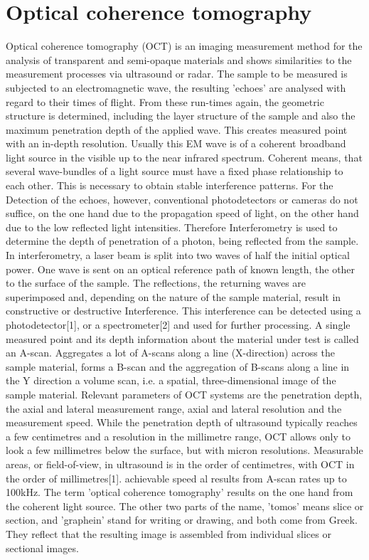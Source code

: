 \section{Optical coherence tomography}
Optical coherence tomography (OCT) is an imaging measurement method for the analysis of transparent and semi-opaque materials and shows similarities to the measurement processes via ultrasound or radar. The sample to be measured is subjected to an electromagnetic wave, the resulting 'echoes' are analysed with regard to their times of flight. From these run-times again,  the geometric structure is determined, including the layer structure of the sample and also the maximum penetration depth of the applied wave. This creates measured point with an in-depth resolution. Usually this EM wave is of a coherent broadband light source in the visible  up to the near infrared spectrum. Coherent means, that several wave-bundles of a light source must have a fixed phase relationship to each other. This is necessary to obtain stable interference patterns.  For the Detection of the echoes, however, conventional photodetectors or cameras do not suffice, on the one hand due to the propagation speed of light, on the other hand due to the low reflected light intensities. Therefore Interferometry is used to determine the depth of penetration of a photon, being reflected from the sample. In interferometry, a laser beam is split into two waves of half the initial optical power. One wave is sent on an optical reference path of known length, the other to the surface of the sample. The reflections, the returning waves are superimposed and, depending on the nature of the sample material, result in constructive or destructive Interference. This interference can be detected using a photodetector[1], or a spectrometer[2] and used for further processing. A single measured point and its depth information about the material under test is called an A-scan. Aggregates a lot of A-scans along a line (X-direction) across the sample material, forms a B-scan and the aggregation of B-scans along a line in the Y direction a volume scan, i.e. a spatial, three-dimensional image of the sample material. Relevant parameters of OCT systems are the penetration depth, the axial and lateral measurement range, axial and lateral resolution and the measurement speed. While the penetration depth of ultrasound typically reaches a few centimetres and a resolution in the millimetre range, OCT allows only to look a few millimetres below the surface, but with micron resolutions. Measurable areas, or field-of-view, in ultrasound is in the order of centimetres, with OCT in the order of millimetres[1]. achievable speed al results from A-scan rates up to 100kHz. The term 'optical coherence tomography' results on the one hand from the coherent light source. The other two parts of the name, 'tomos' means slice or section, and 'graphein' stand for writing or drawing, and both come from Greek. They reflect that the resulting image is assembled from individual slices or sectional images. 
